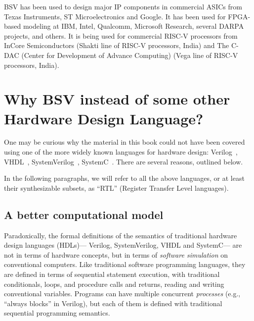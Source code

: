 BSV has been used to design major IP components in commercial ASICs
from Texas Instruments, ST Microelectronics and Google.  It has been
used for FPGA-based modeling at IBM, Intel, Qualcomm, Microsoft
Research, several DARPA projects, and others.  It is being used for
commercial RISC-V processors from InCore Semiconductors (Shakti line
of RISC-V processors, India) and The C-DAC (Center for Development of
Advance Computing) (Vega line of RISC-V processors, India).


\section{Why BSV instead of some other Hardware Design Language?}

\begin{center}
\end{center}

\noindent
One may be curious why the material in this book could not have been
covered using one of the more widely known languages for hardware
design: Verilog~\cite{IEEEVerilog2005a}, VHDL~\cite{IEEEVHDL2002},
SystemVerilog~\cite{IEEESystemVerilog2012a},
SystemC~\cite{IEEESystemC2011a}.  There are several reasons, outlined
below.

In the following paragraphs, we will refer to all the above languages,
or at least their synthesizable subsets, as ``RTL'' (Register Transfer
Level languages).


\subsection{A better computational model}

Paradoxically, the formal definitions of the semantics of traditional
hardware design languages (HDLs)--- Verilog, SystemVerilog, VHDL and
SystemC--- are not in terms of hardware concepts, but in terms of
\emph{software simulation} on conventional computers.  Like
traditional software programming languages, they are defined in terms
of sequential statement execution, with traditional conditionals,
loops, and procedure calls and returns, reading and writing
conventional variables.  Programs can have multiple concurrent
\emph{processes} (e.g., ``always blocks'' in Verilog), but each of
them is defined with traditional sequential programming semantics.

